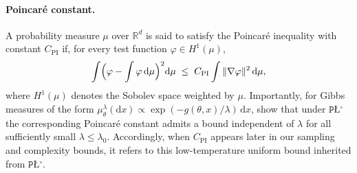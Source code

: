 \documentclass{article}
\def\d{\delta}
\theoremstyle{normaltheorem}
\newcommand{\gibbs}{\mu}
\newcommand{\PLcirc}{\texttt{P\L$^\circ$}}
\newcommand{\R}{\mathbb{R}}
\renewcommand{\d}{\mathrm{d}}
\begin{document}
\paragraph{Poincar\'e constant.}
{
A probability measure \(\mu\) over \(\R^d\) is said to satisfy the Poincar\'e inequality with constant \(C_{\mathrm{PI}}\) if, for every test function \(\varphi \in H^1(\mu)\),
\begin{equation*}
    \int \Bigl(\varphi-\int \varphi \,\d \mu\Bigr)^2 \d \mu \;\le\; C_{\mathrm{PI}} \int \|\nabla \varphi\|^2 \,\d \mu,
\end{equation*}
where \(H^1(\mu)\) denotes the Sobolev space weighted by \(\mu\). Importantly, for Gibbs measures of the form \(\gibbs_\theta^\lambda(\d x)\propto \exp(-g(\theta,x)/\lambda)\,\d x\), \citet{gong2024poincare} show that under \(\PLcirc\) the corresponding Poincar\'e constant admits a bound independent of \(\lambda\) for all sufficiently small \(\lambda\le \lambda_0\). Accordingly, when \(C_{\mathrm{PI}}\) appears later in our sampling and complexity bounds, it refers to this low-temperature uniform bound inherited from \(\PLcirc\).}
\end{document}
